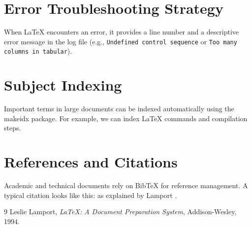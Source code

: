 \documentclass[12pt]{article}
\begin{document}
\section*{Error Troubleshooting Strategy}
When LaTeX encounters an error, it provides a line number and a descriptive error message in the log file (e.g., \texttt{Undefined control sequence} or \texttt{Too many columns in tabular}). 

\section*{Subject Indexing}
Important terms in large documents can be indexed automatically using the makeidx package. For example, we can index LaTeX commands and compilation steps.

\section*{References and Citations}
Academic and technical documents rely on BibTeX for reference management. A typical citation looks like this: as explained by Lamport \cite{lamport}.

\begin{thebibliography}{9}
Leslie Lamport,
\emph{LaTeX: A Document Preparation System},
Addison-Wesley, 1994.
\end{thebibliography}

\printindex
\end{document}
